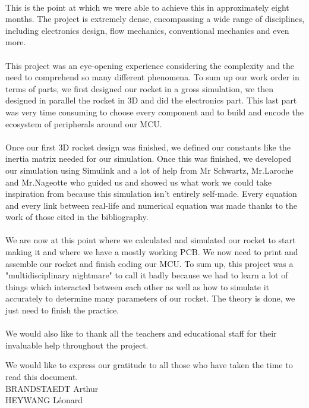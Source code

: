 \paragraph{}
This is the point at which we were able to achieve this in approximately
eight months. The project is extremely dense, encompassing a wide range
of disciplines, including electronics design, flow mechanics, conventional
mechanics and even more.

\paragraph{}
This project was an eye-opening experience considering the complexity
and the need to comprehend so many different phenomena.
To sum up our work order in terms of parts, we first designed our rocket
in a gross simulation, we then designed in parallel the rocket in 3D and
did the electronics part. This last part was very time consuming to choose
every component and to build and encode the ecosystem of peripherals around
our MCU.

\paragraph{}
Once our first 3D rocket design was finished, we defined our constants like
the inertia matrix needed for our simulation. Once this was finished, we
developed our simulation using Simulink and a lot of help from Mr Schwartz,
Mr.Laroche and Mr.Nageotte who guided us and showed us what work we could
take inspiration from because this simulation isn't entirely self-made.
Every equation and every link between real-life and numerical equation was
made thanks to the work of those cited in the bibliography.

\paragraph{}
We are now at this point where we calculated and simulated our rocket to
start making it and where we have a mostly working PCB. We now need to print
and assemble our rocket and finish coding our MCU.
To sum up, this project was a "multidisciplinary nightmare" to call it badly
because we had to learn a lot of things which interacted between each other
as well as how to simulate it accurately to determine many parameters of
our rocket. The theory is done, we just need to finish the practice.

\paragraph{}
We would also like to thank all the teachers and educational staff for
their invaluable help throughout the project.

\vspace{5cm}
\begin{minipage}[c]{1\textwidth}
    \raggedleft
    We would like to express our gratitude to all those who have taken the time to read this document. \\
    BRANDSTAEDT Arthur \\
    HEYWANG Léonard
\end{minipage}
